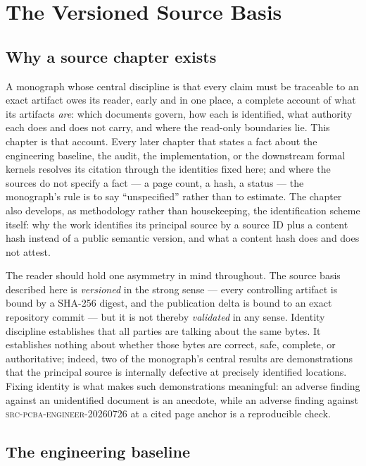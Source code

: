 \chapter{The Versioned Source Basis}\label{ch03:source}

\section{Why a source chapter exists}\label{ch03:why}

A monograph whose central discipline is that every claim must be traceable
to an exact artifact owes its reader, early and in one place, a complete
account of what its artifacts \emph{are}: which documents govern, how each
is identified, what authority each does and does not carry, and where the
read-only boundaries lie. This chapter is that account. Every later chapter
that states a fact about the engineering baseline, the audit, the
implementation, or the downstream formal kernels resolves its citation
through the identities fixed here; and where the sources do not specify a
fact --- a page count, a hash, a status --- the monograph's rule is to say
``unspecified'' rather than to estimate. The chapter also develops, as
methodology rather than housekeeping, the identification scheme itself:
why the work identifies its principal source by a source ID plus a
content hash instead of a public semantic version, and what a content
hash does and does not attest.

The reader should hold one asymmetry in mind throughout. The source basis
described here is \emph{versioned} in the strong sense --- every
controlling artifact is bound by a SHA-256 digest, and the publication
delta is bound to an exact repository commit --- but it is not thereby
\emph{validated} in any sense. Identity discipline establishes that all
parties are talking about the same bytes. It establishes nothing about
whether those bytes are correct, safe, complete, or authoritative; indeed,
two of the monograph's central results are demonstrations that the
principal source is internally defective at precisely identified
locations. Fixing identity is what makes such demonstrations meaningful:
an adverse finding against an unidentified document is an anecdote, while
an adverse finding against
\textsc{src-pcba-engineer-20260726} at a cited page anchor is a
reproducible check.

\section{The engineering baseline}\label{ch03:baseline}

